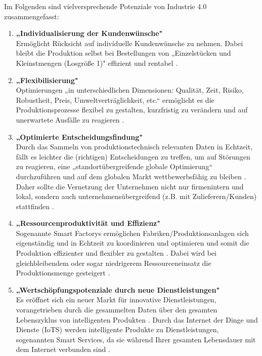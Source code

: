 \newline
Im Folgenden sind vielversprechende Potenziale von Industrie 4.0 zusammengefasst:
\begin{enumerate}
	\item \textbf{„Individualisierung der Kundenwünsche"} \cite[S.19]{12} \\
	Ermöglicht Rücksicht auf individuelle Kundenwünsche zu nehmen. Dabei bleibt die 
	Produktion selbst bei Bestellungen von „Einzelstücken und Kleinstmengen (Losgröße 1)" \cite[S.19]{12} effizient und rentabel \cite[S.19]{12}.
	\item \textbf{„Flexibilisierung"} \cite[S.20]{12} \\
	Optimierungen „in unterschiedlichen Dimensionen: Qualität, Zeit, Risiko, Robustheit, Preis,
	Umweltverträglichkeit, etc.“ ermöglicht es die Produktionsprozesse flexibel zu gestalten,
	kurzfristig zu verändern und auf unerwartete Ausfälle zu reagieren \cite[S.20]{12}.
	\item \textbf{„Optimierte Entscheidungsfindung"} \cite[S.20]{12} \\
	Durch das Sammeln von produktionstechnisch relevanten Daten in Echtzeit, fällt es leichter
	die (richtigen) Entscheidungen zu treffen, um auf Störungen zu reagieren, eine
	„standortübergreifende globale Optimierung“ \cite[S.20]{12} durchzuführen und auf dem globalen Markt wettbewerbsfähig zu bleiben \cite[S.20]{12}. Daher sollte die Vernetzung der 
	Unternehmen nicht nur firmenintern und lokal, sondern auch unternehmensübergreifend (z.B. mit Zulieferern/Kunden) stattfinden \cite{6}.
	\item \textbf{„Ressourcenproduktivität und Effizienz"} \cite[S.20]{12} \\
	Sogenannte Smart Factorys ermöglichen Fabriken/Produktionsanlagen sich eigenständig und in Echtzeit zu koordinieren und optimieren und somit die Produktion effizienter und flexibler zu gestalten \cite{6}. Dabei wird bei gleichbleibendem oder sogar niedrigerem Ressourceneinsatz die Produktionsmenge gesteigert \cite[S.20]{12}.
	\item \textbf{„Wertschöpfungspotenziale durch neue Dienstleistungen"} \cite[S.20]{12} \\
	Es eröffnet sich ein neuer Markt für innovative Dienstleistungen, vorangetrieben durch die
	gesammelten Daten über den gesamten Lebenszyklus von intelligenten Produkten 
	\cite[S.20]{12}. Durch das Internet der Dinge und Dienste (IoTS) werden intelligente Produkte zu Dienstleistungen, sogenannten Smart Services, da sie während Ihrer gesamten Lebensdauer mit dem Internet verbunden sind \cite{6}.

\end{enumerate}
